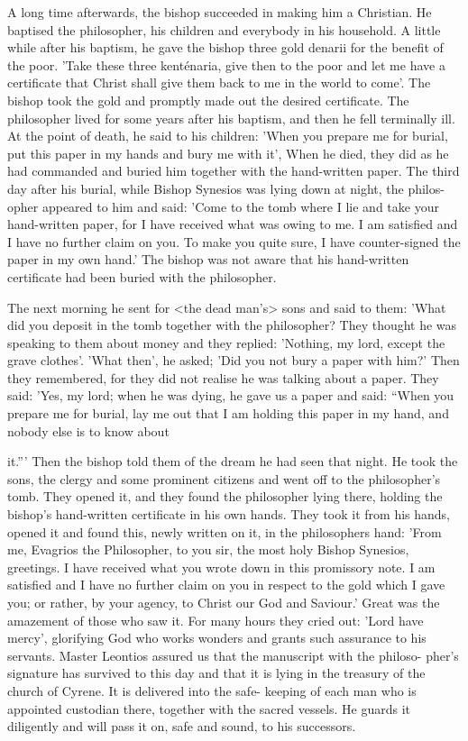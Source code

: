 A long time afterwards, the bishop succeeded in making him a
Christian. He baptised the philosopher, his children and everybody
in his household. A little while after his baptism, he gave the bishop
three gold denarii for the benefit of the poor. 'Take these three
kenténaria, give then to the poor and let me have a certificate that
Christ shall give them back to me in the world to come'. The bishop
took the gold and promptly made out the desired certificate. The
philosopher lived for some years after his baptism, and then he fell
terminally ill. At the point of death, he said to his children: 'When
you prepare me for burial, put this paper in my hands and bury me
with it', When he died, they did as he had commanded and buried
him together with the hand-written paper. The third day after his
burial, while Bishop Synesios was lying down at night, the philos-
opher appeared to him and said: 'Come to the tomb where I lie and
take your hand-written paper, for I have received what was owing
to me. I am satisfied and I have no further claim on you. To make
you quite sure, I have counter-signed the paper in my own hand.'
The bishop was not aware that his hand-written certificate had been
buried with the philosopher.

The next morning he sent for <the dead man's> sons and said
to them: 'What did you deposit in the tomb together with the
philosopher? They thought he was speaking to them about money
and they replied: 'Nothing, my lord, except the grave clothes'. 'What
then', he asked; 'Did you not bury a paper with him?' Then they
remembered, for they did not realise he was talking about a paper.
They said: 'Yes, my lord; when he was dying, he gave us a paper
and said: “When you prepare me for burial, lay me out that I am
holding this paper in my hand, and nobody else is to know about

it.”' Then the bishop told them of the dream he had seen that night.
He took the sons, the clergy and some prominent citizens and went
off to the philosopher's tomb. They opened it, and they found the
philosopher lying there, holding the bishop's hand-written certificate
in his own hands. They took it from his hands, opened it and found
this, newly written on it, in the philosopher\textquotesingle s hand: 'From me,
Evagrios the Philosopher, to you sir, the most holy Bishop Synesios,
greetings. I have received what you wrote down in this promissory
note. I am satisfied and I have no further claim on you in respect
to the gold which I gave you; or rather, by your agency, to Christ
our God and Saviour.' Great was the amazement of those who saw
it. For many hours they cried out: 'Lord have mercy', glorifying
God who works wonders and grants such assurance to his servants.
Master Leontios assured us that the manuscript with the philoso-
pher's signature has survived to this day and that it is lying in the
treasury of the church of Cyrene. It is delivered into the safe-
keeping of each man who is appointed custodian there, together
with the sacred vessels. He guards it diligently and will pass it on,
safe and sound, to his successors.


